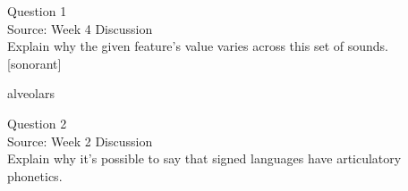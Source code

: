 \documentclass[12pt]{article}
\begin{document}
\begin{center}
\textbf{{\color{violet}{\HUGE 20201007 Wednesday\\}}}

\textbf{{\color{violet}{\HUGE ALL EXAMS\\}}}

\end{center}
\newpage

\begin{center}
\textbf{{\color{blue}{\HUGE START OF EXAM\\}}}

\textbf{{\color{blue}{\HUGE Student ID: 23100\\}}}

\textbf{{\color{blue}{\HUGE 9:00\\}}}

\end{center}
\newpage

{\large Question 1}\\

Source: Week 4 Discussion\\

Explain why the given feature's value varies across this set of sounds.\\

{[sonorant]}

alveolars


\newpage

{\large Question 2}\\

Source: Week 2 Discussion\\

Explain why it's possible to say that signed languages have articulatory phonetics.\\


\newpage

\begin{center}
\textbf{{\color{red}{\HUGE END OF EXAM}}}\\

\end{center}
\newpage

\begin{center}
\textbf{{\color{blue}{\HUGE START OF EXAM\\}}}

\textbf{{\color{blue}{\HUGE Student ID: 23000\\}}}

\textbf{{\color{blue}{\HUGE 9:10\\}}}

\end{center}
\newpage
\end{document}
